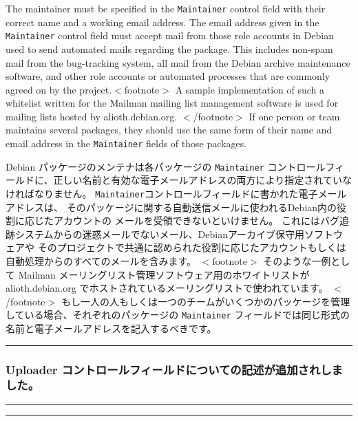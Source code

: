 \documentclass[mingoth,a4paper]{jsarticle}
\begin{document}
\par
\parbox[t]{0.48\linewidth}{
	  The maintainer must be specified in the {\tt Maintainer}
	  control field with their correct name and a working email
	  address.  The email address given in the {\tt Maintainer}
	  control field must accept mail from those role accounts in
	  Debian used to send automated mails regarding the package.  This
	  includes non-spam mail from the bug-tracking system, all mail
	  from the Debian archive maintenance software, and other role
	  accounts or automated processes that are commonly agreed on by
	  the project.$<$footnote$>$
	    A sample implementation of such a whitelist written for the
	    Mailman mailing list management software is used for mailing
	    lists hosted by alioth.debian.org.
	  $<$/footnote$>$
	  If one person or team maintains several packages, they should
	  use the same form of their name and email address in
	  the {\tt Maintainer} fields of those packages.
}\hfil
\parbox[t]{0.48\linewidth}{
	    Debian パッケージのメンテナは各パッケージの {\tt Maintainer}
	    コントロールフィールドに、正しい名前と有効な電子メールアドレスの両方により指定されていなければなりません。
	    {\tt Maintainer}コントロールフィールドに書かれた電子メールアドレスは、
	    そのパッケージに関する自動送信メールに使われるDebian内の役割に応じたアカウントの
	    メールを受領できないといけません。
	    これにはバグ追跡システムからの迷惑メールでないメール、Debianアーカイブ保守用ソフトウェアや
	    そのプロジェクトで共通に認められた役割に応じたアカウントもしくは自動処理からのすべてのメールを含みます。
	    $<$footnote$>$
		そのような一例として Mailman メーリングリスト管理ソフトウェア用のホワイトリストが
	      alioth.debian.org でホストされているメーリングリストで使われています。
	    $<$/footnote$>$
	    もし一人の人もしくは一つのチームがいくつかのパッケージを管理している場合、それぞれのパッケージの
	    {\tt Maintainer} フィールドでは同じ形式の名前と電子メールアドレスを記入するべきです。
}
\hrule
\vspace{1ex}

\clearpage

\subsubsection{Uploader コントロールフィールドについての記述が追加されしました。}

\vspace{1ex}
\hrule
{}\par
\parbox[t]{0.48\linewidth}{
}\hfil
\parbox[t]{0.48\linewidth}{
}
\hrule
\end{document}

